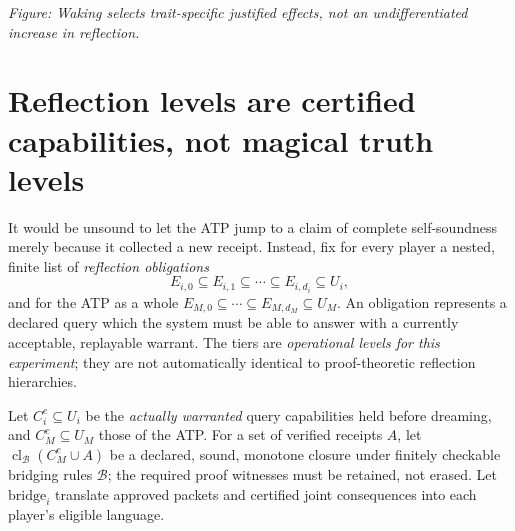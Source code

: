 \documentclass[11pt,letterpaper]{article}
\theoremstyle{definition}
\theoremstyle{plain}
\theoremstyle{definition}
\newcommand{\cl}{\operatorname{cl}}
\newcommand{\B}{\mathcal B}
\begin{document}
\begin{center}
\par\small\emph{Figure: Waking selects trait-specific justified effects, not an undifferentiated increase in reflection.}
\end{center}

\section{Reflection levels are certified capabilities, not magical truth levels}\label{gl-first-W0-s9}
It would be unsound to let the ATP jump to a claim of complete self-soundness merely because it collected a new receipt. Instead, fix for every player a nested, finite list of \emph{reflection obligations}
\[
 E_{i,0}\subseteq E_{i,1}\subseteq\cdots\subseteq E_{i,d_i}\subseteq U_i,
\]
and for the ATP as a whole $E_{M,0}\subseteq\cdots\subseteq E_{M,d_M}\subseteq U_M$. An obligation represents a declared query which the system must be able to answer with a currently acceptable, replayable warrant. The tiers are \emph{operational levels for this experiment}; they are not automatically identical to proof-theoretic reflection hierarchies.

Let $C_i^e\subseteq U_i$ be the \emph{actually warranted} query capabilities held before dreaming, and $C_M^e\subseteq U_M$ those of the ATP. For a set of verified receipts $A$, let $\cl_{\B}(C_M^e\cup A)$ be a declared, sound, monotone closure under finitely checkable bridging rules $\B$; the required proof witnesses must be retained, not erased. Let $\mathrm{bridge}_i$ translate approved packets and certified joint consequences into each player's eligible language.
\end{document}
